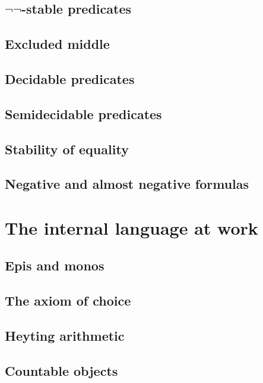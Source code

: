\subsection[\texorpdfstring{$\neg\neg$-stable predicates}{Not-not-stable predicates}]{$\neg\neg$-stable predicates}
\label{sec:stable-predicates}

\subsection{Excluded middle}
\label{sec:excluded-middle}

\subsection{Decidable predicates}
\label{sec:decidable-predicates}

\subsection{Semidecidable predicates}
\label{sec:semidecidable-predicates}

\subsection{Stability of equality}
\label{sec:stability-equality}

\subsection{Negative and almost negative formulas}
\label{sec:negat-almost-negat}



\section{The internal language at work}
\label{sec:internal-language-at}

\subsection{Epis and monos}
\label{sec:epis-monos}

\subsection{The axiom of choice}
\label{sec:axiom-choice}

\subsection{Heyting arithmetic}
\label{sec:heyting-arithmetic}

\subsection{Countable objects}
\label{sec:countable-objects}






